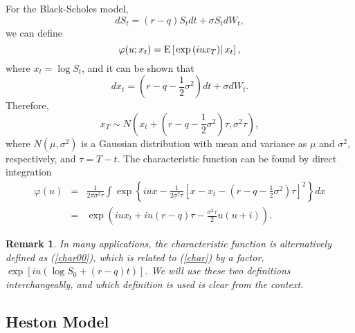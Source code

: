 \documentclass[12pt]{article}
\newtheorem{remark}{Remark}
\begin{document}
    For the Black-Scholes model,
    \begin{equation}
      dS_t=(r-q)S_tdt+\sigma S_tdW_t,
    \end{equation}
    we can define
    \begin{equation}
      \varphi(u; x_t)={\rm E}\left[\left.\exp\left(iux_T\right)\right|x_t\right],
      \label{char00}
    \end{equation}
    where $x_t=\log S_t$, and it can be shown that
    \begin{equation}
      dx_t = \left(r-q-\frac{1}{2}\sigma^2\right) dt + \sigma dW_t.
    \end{equation}
    Therefore,
    \begin{equation}
      x_T\sim N\left(x_t+\left(r-q-\frac{1}{2}\sigma^2\right)\tau, \sigma^2\tau\right),
    \end{equation}
    where $N(\mu,\sigma^2)$ is a Gaussian distribution with mean and variance
    as $\mu$ and $\sigma^2$, respectively, and $\tau=T-t$. The characteristic function can be found by direct integration
    \begin{eqnarray}
      \varphi(u)&=&\frac{1}{2\pi\sigma^2 \tau}\int \exp\left\{iux-\frac{1}{2\sigma^2\tau}
                      \left[x-x_t-\left(r-q-\frac{1}{2}\sigma^2\right)\tau\right]^2\right\}dx\nonumber\\
                &=&\exp\left(iux_t + iu(r-q)\tau -\frac{\sigma^2\tau}{2}u(u+i)\right).
      \label{BS}
    \end{eqnarray}

    \begin{remark}
      In many applications, the characteristic function is alternatively defined as (\ref{char00}), which is related
      to (\ref{char}) by a factor, $\exp\left[iu(\log S_0 +(r-q)t)\right]$. We will use these two definitions interchangeably, and which
      definition is used is clear from the context.
    \end{remark}

  \subsection{Heston Model}
\end{document}
